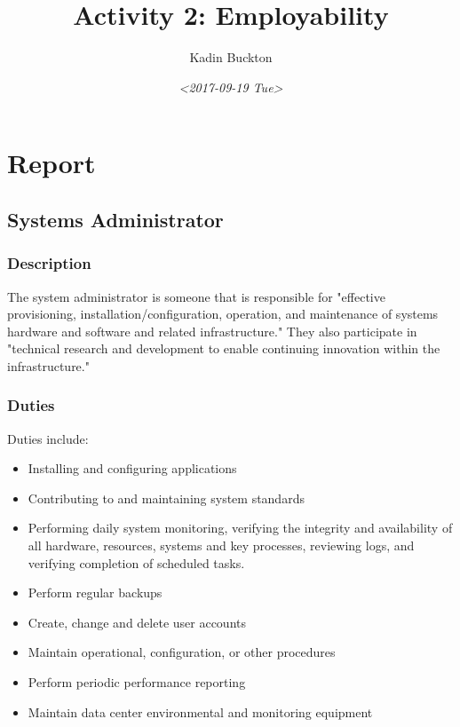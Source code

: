 \documentclass[11pt]{article}
\author{Kadin Buckton}
\date{\textit{<2017-09-19 Tue>}}
\title{Activity 2: Employability}
\begin{document}
\maketitle
\tableofcontents


\section*{Report}
\label{sec:org97dfc5c}

\subsection*{Systems Administrator}
\label{sec:org5835df8}

\subsubsection*{Description}
\label{sec:orgb4499a4}

The system administrator is someone that is responsible for "effective provisioning, installation/configuration, operation, and maintenance of systems hardware and software and related infrastructure." They also participate in "technical research and development to enable continuing innovation within the infrastructure."

\subsubsection*{Duties}
\label{sec:org5e68a4b}

Duties include:
\begin{itemize}
\item Installing and configuring applications
\item Contributing to and maintaining system standards
\item Performing daily system monitoring, verifying the integrity and availability of all hardware, resources, systems and key processes, reviewing logs, and verifying completion of scheduled tasks.
\item Perform regular backups
\item Create, change and delete user accounts
\item Maintain operational, configuration, or other procedures
\item Perform periodic performance reporting
\item Maintain data center environmental and monitoring equipment
\end{itemize}
\end{document}
